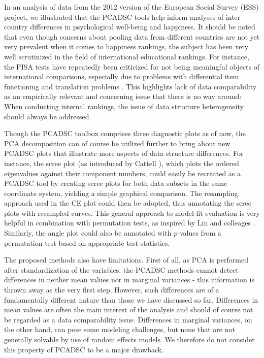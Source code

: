 \documentclass[a4paper,14pt]{article}
\begin{document}
In an analysis of data from the 2012 version of the European Social Survey (ESS) project, we illustrated that the PCADSC tools help inform analyses of inter-country differences in psychological well-being and happiness. It should be noted that even though concerns about pooling data from different countries are not yet very prevalent when it comes to happiness rankings, the subject has been very well scrutinized in the field of international educational rankings. For instance, the PISA tests have repeatedly been criticized for not being meaningful objects of international comparisons, especially due to problems with differential item functioning \cite{Kankaras2014,Kreiner2014,ZwitserEtAl2017} and translation problems \cite{Asil2016}. This highlights lack of data comparability as an empirically relevant and concerning issue that there is no way around: When conducting internal rankings, the issue of data structure heterogeneity should always be addressed.

Though the PCADSC toolbox comprises three diagnostic plots as of now, the PCA decomposition can of course be utilized further to bring about new PCADSC plots that illustrate more aspects of data structure differences. For instance, the scree plot (as introduced by Cattell \cite{Cattell1966}), which plots the ordered eigenvalues against their component numbers, could easily be recreated as a PCADSC tool by creating scree plots for both data subsets in the same coordinate system, yielding a simple graphical comparison. The resampling approach used in the CE plot could then be adopted, thus annotating the scree plots with resampled curves. This general approach to model-fit evaluation is very helpful in combination with permutation tests, as inspired by Lin and colleages \cite{LinEtAl2002}. Similarly, the angle plot could also be annotated with $p$-values from a permutation test based on appropriate test statistics.

The proposed methods also have limitations. First of all, as PCA is performed after standardization of the variables, the PCADSC methods cannot detect differences in neither mean values nor in marginal variances - this information is thrown away as the very first step. However, such differences are of a fundamentally different nature than those we have discussed so far. Differences in mean values are often the main interest of the analysis and should of course not be regarded as a data comparability issue. Differences in marginal variances, on the other hand, can pose some modeling challenges, but none that are not generally solvable by use of random effects models. We therefore do not consider this property of PCADSC to be a major drawback.
\end{document}

